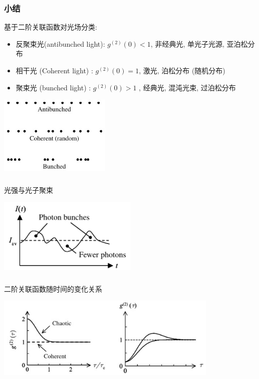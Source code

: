 \begin{frame} 
    \frametitle{小结}
    基于二阶关联函数对光场分类:
    \begin{itemize}
        \item 反聚束光(antibunched light): $g^{(2)}(0)<1$, 非经典光, 单光子光源, 亚泊松分布 
        \item 相干光 (Coherent light) : $g^{(2)}(0)=1$, 激光, 泊松分布 (随机分布)
        \item 聚束光 (bunched light) : $g^{(2)}(0)>1$ , 经典光, 混沌光束, 过泊松分布 
    \end{itemize}
      \begin{center}
           \includegraphics[width=0.4\textwidth]{figs/2022-05-09-10-30-03.png}
      \end{center}       
\end{frame}

\begin{frame}  
    \frametitle{}
    光强与光子聚束 
      \begin{center}
           \includegraphics[width=0.5\textwidth]{figs/2022-05-09-11-42-49.png}
      \end{center}
\end{frame}

\begin{frame}  
    \frametitle{}
    二阶关联函数随时间的变化关系
      \begin{center}
           \includegraphics[width=0.8\textwidth]{figs/21.png}
      \end{center}
\end{frame}

